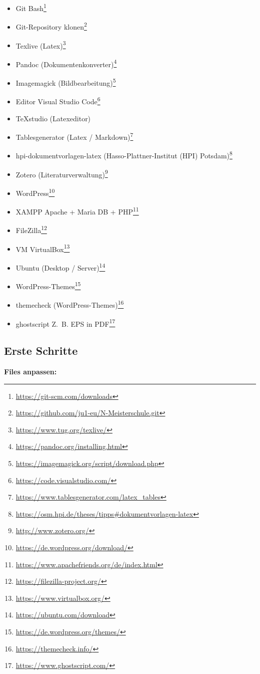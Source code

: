 \begin{itemize}
\item
  Git Bash\footnote{\url{https://git-scm.com/downloads}}
\item
  Git-Repository klonen\footnote{\url{https://github.com/ju1-eu/N-Meisterschule.git}}
\item
  Texlive (Latex)\footnote{\url{https://www.tug.org/texlive/}}
\item
  Pandoc (Dokumentenkonverter)\footnote{\url{https://pandoc.org/installing.html}}
\item
  Imagemagick (Bildbearbeitung)\footnote{\url{https://imagemagick.org/script/download.php}}
\item
  Editor Visual Studio Code\footnote{\url{https://code.visualstudio.com/}}
\item
  TeXstudio (Latexeditor)
\item
  Tablesgenerator (Latex / Markdown)\footnote{\url{https://www.tablesgenerator.com/latex_tables}}
\item
  hpi-dokumentvorlagen-latex (Hasso-Plattner-Institut (HPI)
  Potsdam)\footnote{\url{https://osm.hpi.de/theses/tipps\#dokumentvorlagen-latex}}
\item
  Zotero (Literaturverwaltung)\footnote{\url{http://www.zotero.org/}}
\item
  WordPress\footnote{\url{https://de.wordpress.org/download/}}
\item
  XAMPP Apache + Maria DB + PHP\footnote{\url{https://www.apachefriends.org/de/index.html}}
\item
  FileZilla\footnote{\url{https://filezilla-project.org/}}
\item
  VM VirtualBox\footnote{\url{https://www.virtualbox.org/}}
\item
  Ubuntu (Desktop / Server)\footnote{\url{https://ubuntu.com/download}}
\item
  WordPress-Themes\footnote{\url{https://de.wordpress.org/themes/}}
\item
  themecheck (WordPress-Themes)\footnote{\url{https://themecheck.info/}}
\item
  ghostscript Z.~B. EPS in PDF\footnote{\url{https://www.ghostscript.com/}}
\end{itemize}

\subsection{Erste Schritte}\label{erste-schritte}

\textbf{Files anpassen:}


